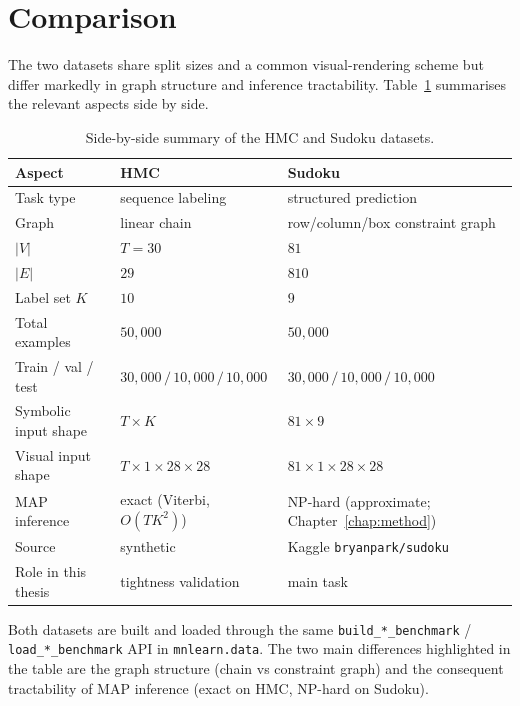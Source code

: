 \section{Comparison}
\label{sec:datasets-comparison}

The two datasets share split sizes and a common visual-rendering
scheme but differ markedly in graph structure and inference
tractability. Table~\ref{tab:datasets-comparison} summarises the
relevant aspects side by side.

\begin{table}[htbp]
\centering
\renewcommand{\arraystretch}{1.2}
\begin{tabular}{l l l}
\hline
\textbf{Aspect} & \textbf{HMC} & \textbf{Sudoku} \\
\hline
Task type                 & sequence labeling
                          & structured prediction \\
Graph                     & linear chain
                          & row/column/box constraint graph \\
$|V|$                     & $T = 30$
                          & $81$ \\
$|E|$                     & $29$
                          & $810$ \\
Label set $K$             & $10$
                          & $9$ \\
Total examples            & $50{,}000$
                          & $50{,}000$ \\
Train / val / test        & $30{,}000\,/\,10{,}000\,/\,10{,}000$
                          & $30{,}000\,/\,10{,}000\,/\,10{,}000$ \\
Symbolic input shape      & $T \times K$
                          & $81 \times 9$ \\
Visual input shape        & $T \times 1 \times 28 \times 28$
                          & $81 \times 1 \times 28 \times 28$ \\
MAP inference             & exact (Viterbi, $O(T K^{2})$)
                          & NP-hard (approximate; Chapter~\ref{chap:method}) \\
Source                    & synthetic
                          & Kaggle \texttt{bryanpark/sudoku} \\
Role in this thesis       & tightness validation
                          & main task \\
\hline
\end{tabular}
\caption[Datasets summary]{Side-by-side summary of the HMC and
Sudoku datasets.}
\label{tab:datasets-comparison}
\end{table}

Both datasets are built and loaded through the same
\texttt{build\_*\_benchmark} / \texttt{load\_*\_benchmark} API in
\texttt{mnlearn.data}. The two main differences highlighted in the
table are the graph structure (chain vs constraint graph) and the
consequent tractability of MAP inference (exact on HMC, NP-hard on
Sudoku).